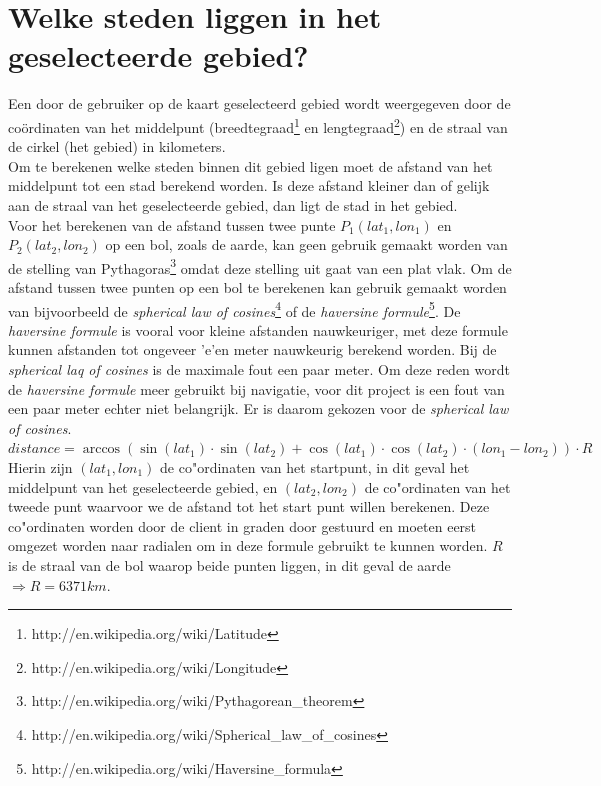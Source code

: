 \documentclass[twoside,openright]{uva-bachelor-thesis}
\begin{document}
	\section{Welke steden liggen in het geselecteerde gebied?}
		Een door de gebruiker op de kaart geselecteerd gebied wordt weergegeven door de co\"ordinaten van het middelpunt (breedtegraad\footnote{http://en.wikipedia.org/wiki/Latitude} en lengtegraad\footnote{http://en.wikipedia.org/wiki/Longitude}) en de straal van de cirkel (het gebied) in kilometers.
		\\[0.5cm]
		Om te berekenen welke steden binnen dit gebied ligen moet de afstand van het middelpunt tot een stad berekend worden. Is deze afstand kleiner dan of gelijk aan de straal van het geselecteerde gebied, dan ligt de stad in het gebied.
		\\[0.5cm]
		Voor het berekenen van de afstand tussen twee punte $P_1(lat_1, lon_1)$ en $P_2(lat_2, lon_2)$ op een bol, zoals de aarde,  kan geen gebruik gemaakt worden van de stelling van Pythagoras\footnote{http://en.wikipedia.org/wiki/Pythagorean\_theorem} omdat deze stelling uit gaat van een plat vlak. Om de afstand tussen twee punten op een bol te berekenen kan gebruik gemaakt worden van bijvoorbeeld de \textit{spherical law of cosines}\footnote{http://en.wikipedia.org/wiki/Spherical\_law\_of\_cosines} of de \textit{haversine formule}\footnote{http://en.wikipedia.org/wiki/Haversine\_formula}. De \textit{haversine formule} is vooral voor kleine afstanden nauwkeuriger, met deze formule kunnen afstanden tot ongeveer 'e'en meter nauwkeurig berekend worden. Bij de \textit{spherical laq of cosines} is de maximale fout een paar meter. Om deze reden wordt de \textit{haversine formule} meer gebruikt bij navigatie, voor dit project is een fout van een paar meter echter niet belangrijk. Er is daarom gekozen voor de \textit{spherical law of cosines}.
		\\[0.5cm]
		$distance = \arccos(\sin(lat_1) \cdot \sin(lat_2) + \cos(lat_1) \cdot \cos(lat_2) \cdot(lon_1 - lon_2)) \cdot R$
		\\[0.5cm]
		Hierin zijn $(lat_1, lon_1)$ de co"ordinaten van het startpunt, in dit geval het middelpunt van het geselecteerde gebied, en $(lat_2, lon_2)$ de co"ordinaten van het tweede punt waarvoor we de afstand tot het start punt willen berekenen. Deze co"ordinaten worden door de client in graden door gestuurd en moeten eerst omgezet worden naar radialen om in deze formule gebruikt te kunnen worden. $R$ is de straal van de bol waarop beide punten liggen, in dit geval de aarde $ 	\Rightarrow R = 6371km$.
\end{document}
